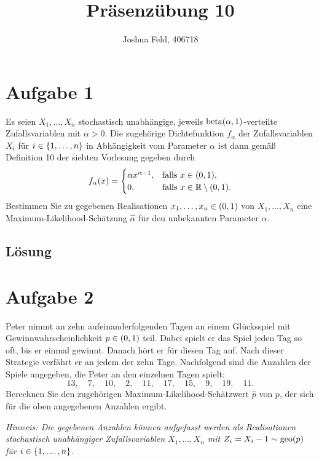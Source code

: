 \documentclass{exercise}
\institute{Institut für Statistik und Wirtschaftsmathematik}
\title{Präsenzübung 10}
\author{Joshua Feld, 406718}
\begin{document}
    \maketitle


    \section*{Aufgabe 1}
    
    \begin{problem}
        Es seien \(X_1, \ldots, X_n\) stochastisch unabhängige, jeweils \(\betadist\parentheses*{\alpha, 1}\)-verteilte Zufallsvariablen mit \(\alpha > 0\).
        Die zugehörige Dichtefunktion \(f_\alpha\) der Zufallsvariablen \(X_i\) für \(i \in \braces*{1, \ldots, n}\) in Abhängigkeit vom Parameter \(\alpha\) ist dann gemäß Definition 10 der siebten Vorlesung gegeben durch
        \[
            f_\alpha\parentheses*{x} = \begin{cases}
                \alpha x^{\alpha - 1}, & \text{falls }x \in \parentheses*{0, 1},\\
                0, & \text{falls }x \in \R \setminus \parentheses*{0, 1}.
            \end{cases}
        \]
        Bestimmen Sie zu gegebenen Realisationen \(x_1, \ldots, x_n \in \parentheses*{0, 1}\) von \(X_1, \ldots, X_n\) eine Maximum-Likelihood-Schätzung \(\hat{\alpha}\) für den unbekannten Parameter \(\alpha\).
    \end{problem}
    
    \subsection*{Lösung}


    \section*{Aufgabe 2}
    
    \begin{problem}
        Peter nimmt an zehn aufeinanderfolgenden Tagen an einem Glücksspiel mit Gewinnwahrscheinlichkeit \(p \in \parentheses*{0, 1}\) teil.
        Dabei spielt er das Spiel jeden Tag so oft, bis er einmal gewinnt.
        Danach hört er für diesen Tag auf.
        Nach dieser Strategie verfährt er an jedem der zehn Tage.
        Nachfolgend sind die Anzahlen der Spiele angegeben, die Peter an den einzelnen Tagen spielt:
        \[
            13, \quad 7, \quad 10, \quad 2, \quad 11, \quad 17, \quad 15, \quad 9, \quad 19, \quad 11.
        \]
        Berechnen Sie den zugehörigen Maximum-Likelihood-Schätzwert \(\hat{p}\) von \(p\), der sich für die oben angegebenen Anzahlen ergibt.

        \emph{Hinweis: Die gegebenen Anzahlen können aufgefasst werden als Realisationen stochastisch unabhängiger Zufallsvariablen \(X_1, \ldots, X_n\) mit \(Z_i = X_i - 1 \sim \geo\parentheses*{p}\) für \(i \in \braces*{1, \ldots, n}\).}
    \end{problem}
    
\end{document}
